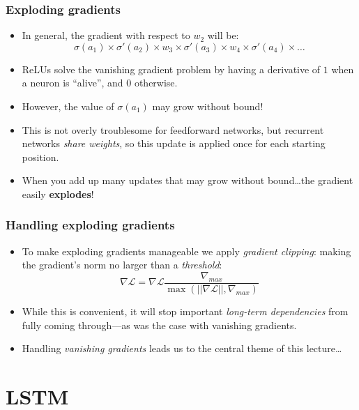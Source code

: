 \documentclass{beamer}
\begin{document}
\begin{frame}
	\frametitle{Exploding gradients}
	\begin{itemize}
		\item In general, the gradient with respect to $w_2$ will be: 
		\[\sigma(a_1)\times \sigma'(a_2)\times w_3\times \sigma'(a_3)\times w_4\times \sigma'(a_4)\times \dots\]
		\vfill
		\item ReLUs solve the vanishing gradient problem by having a derivative of $1$ when a neuron is ``alive'', and $0$ otherwise.
		\vfill
		\item However, the value of $\sigma(a_1)$ may grow without bound! 
		\vfill
		\item This is not overly troublesome for feedforward networks, but recurrent networks \emph{share weights}, so this update is applied once for each starting position.
		\vfill
		\item When you add up many updates that may grow without bound\dots the gradient easily \textbf{explodes}!
	\end{itemize}
\end{frame}

\begin{frame}
	\frametitle{Handling exploding gradients}
	\begin{itemize}
		\item To make exploding gradients manageable we apply \emph{gradient clipping}: making the gradient's norm no larger than a \emph{threshold}:
		\[\nabla\mathcal{L} = \nabla\mathcal{L}\frac{\nabla_{max}}{\max(||\nabla\mathcal{L}||, \nabla_{max})}\]
		\vfill
		\item While this is convenient, it will stop important \emph{long-term dependencies} from fully coming through---as was the case with vanishing gradients.
		\vfill
		\item Handling \emph{vanishing gradients} leads us to the central theme of this lecture\dots
	\end{itemize}
\end{frame}

\section{LSTM}
\end{document}
